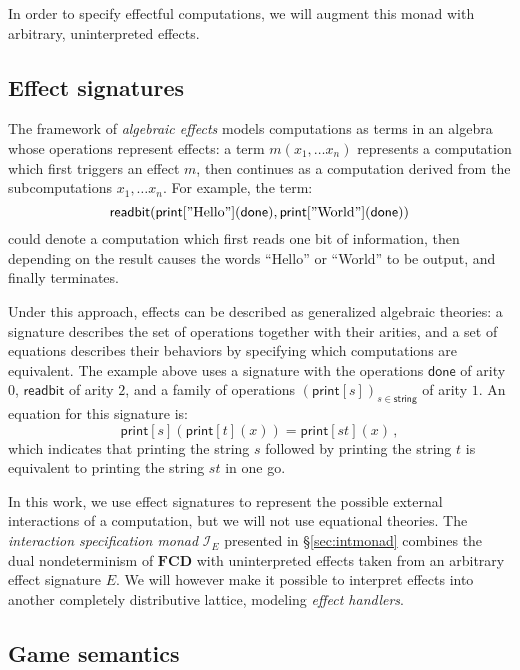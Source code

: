 \documentclass[sigplan,10pt,review,anonymous]{acmart}
\newcommand{\kw}[1]{\ensuremath{ \mathsf{#1} }}
\begin{document}
In order to specify effectful computations,
we will augment this monad with
arbitrary, uninterpreted effects.



\subsection{Effect signatures} \label{sec:bg:sig} %

The framework of \emph{algebraic effects}
models computations as terms in an algebra
whose operations represent effects:
a term $m(x_1, \ldots x_n)$
represents a computation which first
triggers an effect $m$,
then continues as a computation derived from
the subcomputations $x_1, \ldots x_n$.
For example,
the term:
\[
    \kw{readbit}(
      \kw{print}["\text{Hello}"](\kw{done}),
      \kw{print}["\text{World}"](\kw{done}))
\]
could denote a computation which
first reads one bit of information,
then depending on the result
causes the words ``Hello'' or ``World'' to be output,
and finally terminates.

Under this approach,
effects can be described as generalized algebraic theories:
a signature describes the set of operations together with their arities,
and a set of equations describes their behaviors
by specifying which computations are equivalent.
The example above uses a signature with the operations
$\kw{done}$ of arity $0$,
$\kw{readbit}$ of arity $2$,
and a family of operations $(\kw{print}[s])_{s \in \kw{string}}$
of arity $1$.
An equation for this signature is:
\[
    \kw{print}[s](\kw{print}[t](x)) =
    \kw{print}[st](x) \,,
\]
which indicates that
printing the string $s$ followed by
printing the string $t$ is equivalent to
printing the string $st$ in one go.

In this work,
we use effect signatures to represent
the possible external interactions
of a computation,
but we will not use equational theories.
The \emph{interaction specification monad} $\mathcal{I}_E$
presented in \S\ref{sec:intmonad}
combines the dual nondeterminism of $\mathbf{FCD}$ with
uninterpreted effects taken from
an arbitrary effect signature $E$.
We will however make it possible to interpret effects
into another completely distributive lattice,
modeling \emph{effect handlers}.


\subsection{Game semantics} \label{sec:strat} %
\end{document}
